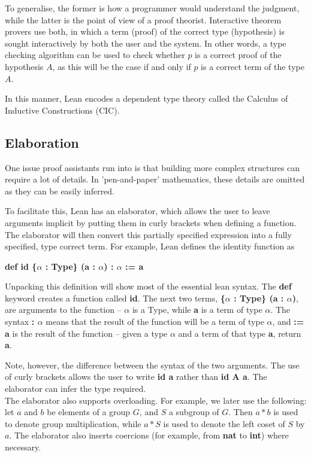 \documentclass[runningheads,a4paper]{llncs}
\renewcommand{\a}{\alpha}
\renewcommand{\-}{\setminus}
\begin{document}
To generalise, the former is how a programmer would understand the judgment, while the latter is the point of view of a proof theorist. Interactive theorem provers use both, in which a term (proof) of the correct type (hypothesis) is sought interactively by both the user and the system. In other words, a type checking algorithm can be used to check whether $p$ is a correct proof of the hypothesis $A$, as this will be the case if and only if $p$ is a correct term of the type $A$.

In this manner, Lean encodes a dependent type theory called the Calculus of Inductive Constructions (CIC).

\subsection{Elaboration}

One issue proof assistants run into is that building more complex structures can require a lot of details. In 'pen-and-paper' mathematics, these details are omitted as they can be easily inferred.

To facilitate this, Lean has an elaborator, which allows the user to leave arguments implicit by putting them in curly brackets when defining a function. The elaborator will then convert this partially specified expression into a fully specified, type correct term. For example, Lean defines the identity function as

\vspace{2 mm}
\hspace{4 em}\textbf{def id \{$\a$ : Type\} (a : $\a$) : $\a$ := a}
\vspace{2 mm}

Unpacking this definition will show most of the essential lean syntax. The \textbf{def} keyword creates a function called \textbf{id}. The next two terms, \textbf{\{$\a$ : Type\} (a : $\a$)}, are arguments to the function -- $\a$ is a Type, while \textbf{a} is a term of type $\a$. The syntax \textbf{: $\a$} means that the result of the function will be a term of type $\a$, and \textbf{:= a} is the result of the function -- given a type $\a$ and a term of that type \textbf{a}, return \textbf{a}.

Note, however, the difference between the syntax of the two arguments. The use of curly brackets allows the user to write \textbf{id a} rather than \textbf{id A a}. The elaborator can infer the type required.\\

The elaborator also supports overloading. For example, we later use the following: let $a$ and $b$ be elements of a group $G$, and $S$ a subgroup of $G$. Then $a*b$ is used to denote group multiplication, while $a * S$ is used to denote the left coset of $S$ by $a$. The elaborator also inserts coercions (for example, from \textbf{nat} to \textbf{int}) where necessary.
\end{document}
